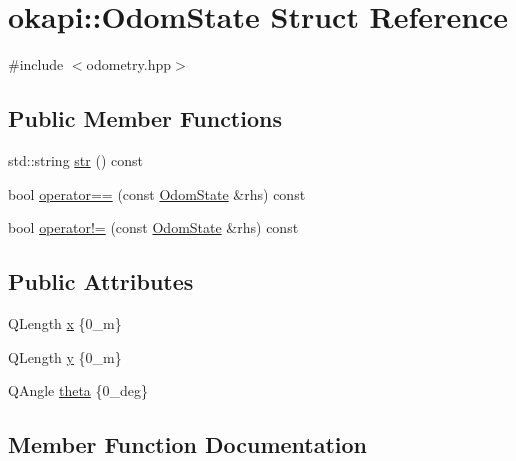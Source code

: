 \hypertarget{structokapi_1_1OdomState}{}\section{okapi\+::Odom\+State Struct Reference}
\label{structokapi_1_1OdomState}


{\ttfamily \#include $<$odometry.\+hpp$>$}

\subsection*{Public Member Functions}
\begin{DoxyCompactItemize}
\item 
std\+::string \mbox{\hyperlink{structokapi_1_1OdomState_adfaa3faf1931a8027af8a3cf9de439c1}{str}} () const
\item 
bool \mbox{\hyperlink{structokapi_1_1OdomState_a17668afbbe39bcc745233a679aa917de}{operator==}} (const \mbox{\hyperlink{structokapi_1_1OdomState}{Odom\+State}} \&rhs) const
\item 
bool \mbox{\hyperlink{structokapi_1_1OdomState_a961501c808d8818e959ba111baf7f359}{operator!=}} (const \mbox{\hyperlink{structokapi_1_1OdomState}{Odom\+State}} \&rhs) const
\end{DoxyCompactItemize}
\subsection*{Public Attributes}
\begin{DoxyCompactItemize}
\item 
Q\+Length \mbox{\hyperlink{structokapi_1_1OdomState_a53fbbb483d5073e703517745d769eb45}{x}} \{0\+\_\+m\}
\item 
Q\+Length \mbox{\hyperlink{structokapi_1_1OdomState_afcb08739959ad3afb7941a0bd59bcbb6}{y}} \{0\+\_\+m\}
\item 
Q\+Angle \mbox{\hyperlink{structokapi_1_1OdomState_a7d9c4f949e7ce0dd000c08318e61b921}{theta}} \{0\+\_\+deg\}
\end{DoxyCompactItemize}


\subsection{Member Function Documentation}
\mbox{\label{structokapi_1_1OdomState_a961501c808d8818e959ba111baf7f359}} 

